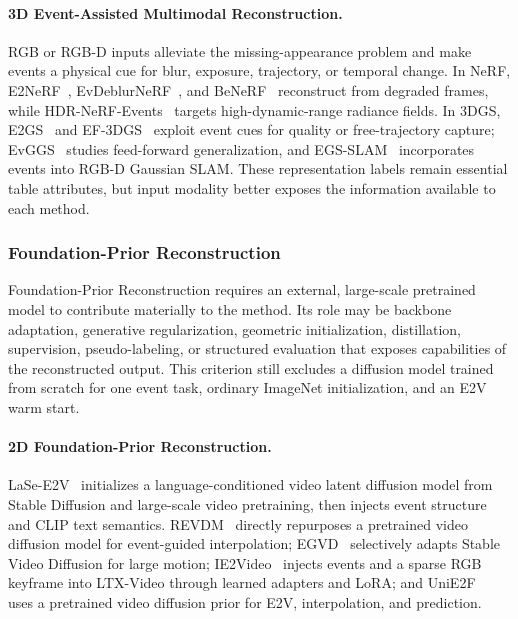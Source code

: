 \paragraph{3D Event-Assisted Multimodal Reconstruction.}
RGB or RGB-D inputs alleviate the missing-appearance problem and make events a physical cue for blur, exposure, trajectory, or temporal change. In NeRF, E2NeRF~\cite{qi2023e2nerf}, EvDeblurNeRF~\cite{cannici2024evdeblurnerf}, and BeNeRF~\cite{li2024benerf} reconstruct from degraded frames, while HDR-NeRF-Events~\cite{qi2026seeing} targets high-dynamic-range radiance fields. In 3DGS, E2GS~\cite{deguchi2024e2gs} and EF-3DGS~\cite{liao2025ef3dgs} exploit event cues for quality or free-trajectory capture; EvGGS~\cite{wang2024evggs} studies feed-forward generalization, and EGS-SLAM~\cite{chen2025egsslam} incorporates events into RGB-D Gaussian SLAM. These representation labels remain essential table attributes, but input modality better exposes the information available to each method.

\subsubsection{Foundation-Prior Reconstruction}
\label{sec:recon_foundation}

Foundation-Prior Reconstruction requires an external, large-scale pretrained model to contribute materially to the method. Its role may be backbone adaptation, generative regularization, geometric initialization, distillation, supervision, pseudo-labeling, or structured evaluation that exposes capabilities of the reconstructed output. This criterion still excludes a diffusion model trained from scratch for one event task, ordinary ImageNet initialization, and an E2V warm start.

\paragraph{2D Foundation-Prior Reconstruction.}
LaSe-E2V~\cite{chen2024lase} initializes a language-conditioned video latent diffusion model from Stable Diffusion and large-scale video pretraining, then injects event structure and CLIP text semantics. REVDM~\cite{chen2025revdm} directly repurposes a pretrained video diffusion model for event-guided interpolation; EGVD~\cite{wang2025egvd} selectively adapts Stable Video Diffusion for large motion; IE2Video~\cite{torbunov2025ie2video} injects events and a sparse RGB keyframe into LTX-Video through learned adapters and LoRA; and UniE2F~\cite{xu2026unie2f} uses a pretrained video diffusion prior for E2V, interpolation, and prediction.

